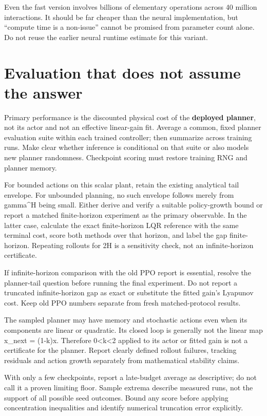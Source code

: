 \documentclass[11pt]{article}
\begin{document}
Even the fast version involves billions of elementary operations across 40 million interactions. It should be far cheaper than the neural implementation, but “compute time is a non-issue” cannot be promised from parameter count alone. Do not reuse the earlier neural runtime estimate for this variant.

\section{Evaluation that does not assume the answer}

Primary performance is the discounted physical cost of the \textbf{deployed planner}, not its actor and not an effective linear-gain fit. Average a common, fixed planner evaluation suite within each trained controller; then summarize across training runs. Make clear whether inference is conditional on that suite or also models new planner randomness. Checkpoint scoring must restore training RNG and planner memory.

For bounded actions on this scalar plant, retain the existing analytical tail envelope. For unbounded planning, no such envelope follows merely from gamma\textasciicircum{}H being small. Either derive and verify a suitable policy-growth bound or report a matched finite-horizon experiment as the primary observable. In the latter case, calculate the exact finite-horizon LQR reference with the same terminal cost, score both methods over that horizon, and label the gap finite-horizon. Repeating rollouts for 2H is a sensitivity check, not an infinite-horizon certificate.

If infinite-horizon comparison with the old PPO report is essential, resolve the planner-tail question before running the final experiment. Do not report a truncated infinite-horizon gap as exact or substitute the fitted gain's Lyapunov cost. Keep old PPO numbers separate from fresh matched-protocol results.

The sampled planner may have memory and stochastic actions even when its components are linear or quadratic. Its closed loop is generally not the linear map x\_next = (1-k)x. Therefore 0<k<2 applied to its actor or fitted gain is not a certificate for the planner. Report clearly defined rollout failures, tracking residuals and action growth separately from mathematical stability claims.

With only a few checkpoints, report a late-budget average as descriptive; do not call it a proven limiting floor. Sample extrema describe measured runs, not the support of all possible seed outcomes. Bound any score before applying concentration inequalities and identify numerical truncation error explicitly.
\end{document}

